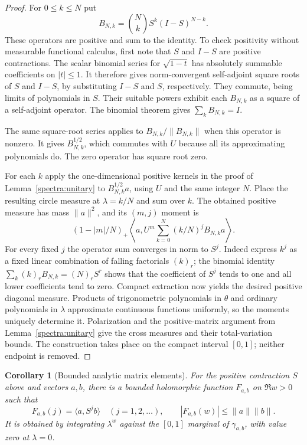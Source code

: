\documentclass[11pt]{article}
\newtheorem{corollary}[theorem]{Corollary}
\theoremstyle{definition}
\theoremstyle{remark}
\numberwithin{equation}{section}
\begin{document}
\begin{proof}
For $0\le k\le N$ put
\[
 B_{N,k}=\binom Nk S^k(I-S)^{N-k}.
\]
These operators are positive and sum to the identity.  To check
positivity without measurable functional calculus, first note that
$S$ and $I-S$ are positive contractions.  The scalar binomial series
for $\sqrt{1-t}$ has absolutely summable coefficients on $|t|\le1$.
It therefore gives norm-convergent self-adjoint square roots of $S$
and $I-S$, by substituting $I-S$ and $S$, respectively.  They commute,
being limits of polynomials in $S$.  Their suitable powers exhibit
each $B_{N,k}$ as a square of a self-adjoint operator.  The binomial
theorem gives $\sum_k B_{N,k}=I$.

The same square-root series applies to $B_{N,k}/\|B_{N,k}\|$ when
this operator is nonzero.  It gives $B_{N,k}^{1/2}$, which commutes
with $U$ because all its approximating polynomials do.  The zero
operator has square root zero.

For each $k$ apply the one-dimensional positive kernels in the proof
of Lemma~\ref{spectra:unitary} to $B_{N,k}^{1/2}a$, using $U$ and
the same integer $N$.  Place the resulting circle measure at
$\lambda=k/N$ and sum over $k$.  The obtained positive measure has
mass $\|a\|^2$, and its $(m,j)$ moment is
\[
 (1-|m|/N)_+
 \left\langle a,U^m\sum_{k=0}^N(k/N)^jB_{N,k}a\right\rangle.
\]
For every fixed $j$ the operator sum converges in norm to $S^j$.
Indeed express $k^j$ as a fixed linear combination of falling
factorials $(k)_r$; the binomial identity
$\sum_k(k)_rB_{N,k}=(N)_rS^r$ shows that the coefficient of $S^j$
tends to one and all lower coefficients tend to zero.
Compact extraction now yields the desired positive diagonal measure.
Products of trigonometric polynomials in $\theta$ and ordinary
polynomials in $\lambda$ approximate continuous functions uniformly,
so the moments uniquely determine it.  Polarization and the
positive-matrix argument from Lemma~\ref{spectra:unitary} give the
cross measures and their total-variation bounds.  The construction
takes place on the compact interval $[0,1]$; neither endpoint is removed.
\end{proof}

\begin{corollary}[Bounded analytic matrix elements]\label{spectra:analytic}
For the positive contraction $S$ above and vectors $a,b$, there is a
bounded holomorphic function $F_{a,b}$ on $\Re w>0$ such that
\[
 F_{a,b}(j)=\langle a,S^jb\rangle\quad(j=1,2,\ldots),
 \qquad |F_{a,b}(w)|\le\|a\|\|b\|.
\]
It is obtained by integrating $\lambda^w$ against the $[0,1]$
marginal of $\gamma_{a,b}$, with value zero at $\lambda=0$.
\end{corollary}
\end{document}
